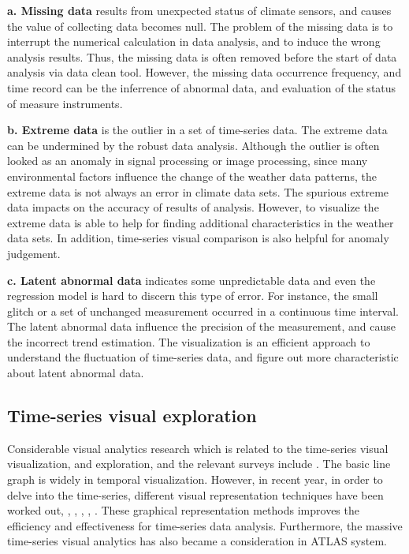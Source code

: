 \documentclass{vgtc}                          %
\begin{document}
{\bf a. Missing data} results from unexpected status of climate sensors, and causes the value of collecting data becomes null. The problem of the missing data is to interrupt the numerical calculation in data analysis, and to induce the wrong analysis results. Thus, the missing data is often removed before the start of data analysis via data clean tool. However, the missing data occurrence frequency, and time record can be the inferrence of abnormal data, and evaluation of the status of measure instruments. 

{\bf b. Extreme data} is the outlier \cite{rousseeuw2005robust}in a set of time-series data. The extreme data can be undermined by the robust data analysis. Although the outlier is often looked as an anomaly in signal processing or image processing, since many environmental factors influence the change of the weather data patterns, the extreme data is not always an error in climate data sets. The spurious extreme data impacts on the accuracy of results of analysis. However, to visualize the extreme data is able to help for finding additional characteristics in the weather data sets. In addition, time-series visual comparison is also helpful for anomaly judgement.
 
{\bf c. Latent abnormal data} indicates some unpredictable data and even the regression model is hard to discern this type of error. For instance, the small glitch or a set of unchanged measurement occurred in a continuous time interval. The latent abnormal data influence the precision of the measurement, and cause the incorrect trend estimation. The visualization is an efficient approach to understand the fluctuation of time-series data, and figure out more characteristic about latent abnormal data.

\subsection{Time-series visual exploration}

Considerable visual analytics research which is related to the time-series visual visualization, and exploration, and the relevant surveys include \cite{silva2000visualization}. The basic line graph \cite{tufte1983visual}is widely in temporal visualization. However, in recent year, in order to delve into the time-series, different visual representation techniques have been worked out\cite{bremm2011interactive}, \cite{mclachlan2008liverac}, \cite{javed2010stack}, \cite{sip2012}, \cite{Liao2010}, \cite{Liao2011}. These graphical representation methods improves the efficiency and effectiveness for time-series data analysis. Furthermore, the massive time-series visual analytics has also became a consideration in ATLAS \cite{chan2008maintaining} system.
 
\end{document}
